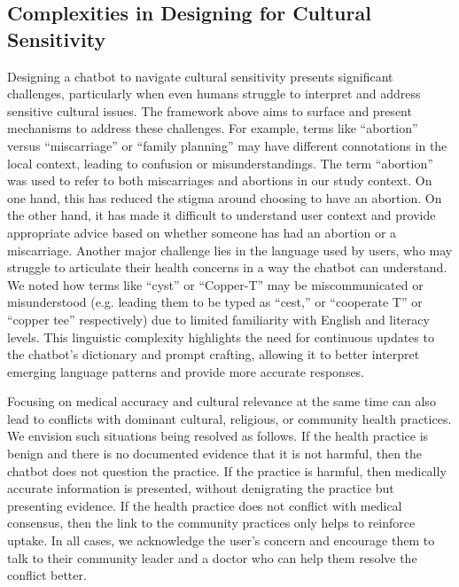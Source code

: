 

\subsection{Complexities in Designing for Cultural Sensitivity}
Designing a chatbot to navigate cultural sensitivity presents significant challenges, particularly when even humans struggle to interpret and address sensitive cultural issues. The framework above aims to surface and present mechanisms to address these challenges. 
For example, terms like ``abortion'' versus ``miscarriage'' or ``family planning'' may have different connotations in the local context, leading to confusion or misunderstandings. The term ``abortion'' was used to refer to both miscarriages and abortions in our study context. On one hand, this has reduced the stigma around choosing to have an abortion. 
On the other hand, it has made it difficult to understand user context and provide appropriate advice based on whether someone has had an abortion or a miscarriage. 
Another major challenge lies in the language used by users, who may struggle to articulate their health concerns in a way the chatbot can understand. We noted how terms like ``cyst'' or ``Copper-T'' may be miscommunicated or misunderstood (e.g. leading them to be typed as ``cest,'' or ``cooperate T'' or ``copper tee'' respectively) due to limited familiarity with English and literacy levels. This linguistic complexity highlights the need for continuous updates to the chatbot's dictionary and prompt crafting, allowing it to better interpret emerging language patterns and provide more accurate responses.

Focusing on medical accuracy and cultural relevance at the same time can also lead to conflicts with dominant cultural, religious, or community health practices. We envision such situations being resolved as follows. If the health practice is benign and there is no documented evidence that it is not harmful, then the chatbot does not question the practice. If the practice is harmful, then medically accurate information is presented, without denigrating the practice but presenting evidence. If the health practice does not conflict with medical consensus, then the link to the community practices only helps to reinforce uptake. In all cases, we acknowledge the user's concern and encourage them to talk to their community leader and a doctor who can help them resolve the conflict better.

